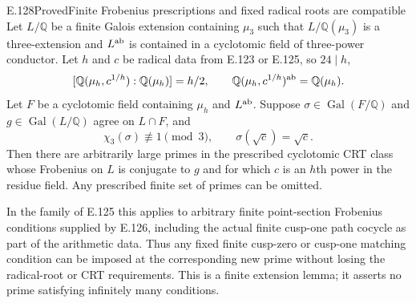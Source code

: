 \begin{result}{E.128}{Proved}{Finite Frobenius prescriptions and fixed radical roots are compatible}
Let $L/\mathbb Q$ be a finite Galois extension containing
$\mu_3$ such that $L/\mathbb Q(\mu_3)$ is a three-extension
and $L^{\rm ab}$ is contained in a cyclotomic field of
three-power conductor. Let $h$ and $c$ be radical data from
E.123 or E.125, so $24\mid h$,
\[
 [\mathbb Q(\mu_h,c^{1/h}):\mathbb Q(\mu_h)]=h/2,
 \qquad
 \mathbb Q(\mu_h,c^{1/h})^{\rm ab}=\mathbb Q(\mu_h).
\]
Let $F$ be a cyclotomic field containing $\mu_h$ and
$L^{\rm ab}$. Suppose $\sigma\in\operatorname{Gal}(F/\mathbb Q)$
and $g\in\operatorname{Gal}(L/\mathbb Q)$ agree on $L\cap F$,
and
\[
 \chi_3(\sigma)\not\equiv1\pmod3,
 \qquad \sigma(\sqrt c)=\sqrt c.
 \tag{E.128.1}
\]
Then there are arbitrarily large primes in the prescribed
cyclotomic CRT class whose Frobenius on $L$ is conjugate to
$g$ and for which $c$ is an $h$th power in the residue field.
Any prescribed finite set of primes can be omitted.

In the family of E.125 this applies to arbitrary finite
point-section Frobenius conditions supplied by E.126,
including the actual finite cusp-one path cocycle as part
of the arithmetic data. Thus any fixed finite cusp-zero
or cusp-one matching condition can be imposed at the
corresponding new prime without losing the radical-root
or CRT requirements. This is a finite extension lemma;
it asserts no prime satisfying infinitely many conditions.
\end{result}
